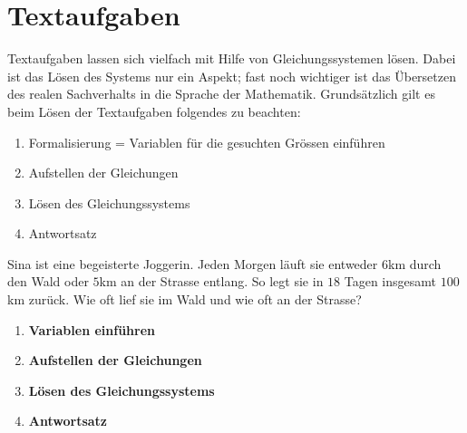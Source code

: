 \documentclass[11pt,oneside]{article}
\begin{document}
\section{Textaufgaben}
	Textaufgaben lassen sich vielfach mit Hilfe von Gleichungssystemen lösen. Dabei ist das Lösen des Systems nur ein Aspekt; fast noch wichtiger ist das Übersetzen des \flqq realen Sachverhalts\frqq\: in die Sprache der Mathematik. Grundsätzlich gilt es beim Lösen der Textaufgaben folgendes zu beachten:
	\begin{enumerate}
		\item Formalisierung = Variablen für die gesuchten Grössen einführen
		\item Aufstellen der Gleichungen
		\item Lösen des Gleichungssystems
		\item Antwortsatz
	\end{enumerate}
	\begin{beispiel}
		Sina ist eine begeisterte Joggerin. Jeden Morgen läuft sie entweder $6$km durch den Wald oder $5$km an der Strasse entlang. So legt sie in $18$ Tagen insgesamt $100$km zurück. Wie oft lief sie im Wald und wie oft an der Strasse?
		\begin{enumerate}
			\item \textbf{Variablen einführen}
		\end{enumerate}
		\begin{enumerate}
			\setcounter{enumi}{1}
			\item \textbf{Aufstellen der Gleichungen}
		\end{enumerate}
		\begin{enumerate}
			\setcounter{enumi}{2}
			\item \textbf{Lösen des Gleichungssystems}
		\end{enumerate}
		\begin{enumerate}
			\setcounter{enumi}{3}
			\item \textbf{Antwortsatz}
		\end{enumerate}
	\end{beispiel}
\end{document}
